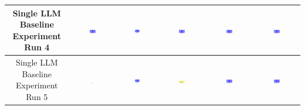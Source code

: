 \begin{table}[H]
\begin{tabular}{|c|c|c|c|c|c|}
    \hline
    Single LLM Baseline Experiment Run 4 & \includegraphics[width=0.15\textwidth]{./run_4/png/gpt-4o_results/BasicLayout.png} & \includegraphics[width=0.15\textwidth]{./run_4/png/claude-3-5-sonnet-20240620_results/BasicLayout.png} & \includegraphics[width=0.15\textwidth]{./run_4/png/watsonx_meta-llama_llama-3-1-70b-instruct_results/BasicLayout.png} & \includegraphics[width=0.15\textwidth]{./run_4/png/watsonx_meta-llama_llama-3-405b-instruct_results/BasicLayout.png} & \includegraphics[width=0.15\textwidth]{./run_4/png/o1-preview_results/BasicLayout.png} \\
    \hline
    Single LLM Baseline Experiment Run 5 & \includegraphics[width=0.15\textwidth]{./run_5/png/gpt-4o_results/BasicLayout.png} & \includegraphics[width=0.15\textwidth]{./run_5/png/claude-3-5-sonnet-20240620_results/BasicLayout.png} & \includegraphics[width=0.15\textwidth]{./run_5/png/watsonx_meta-llama_llama-3-1-70b-instruct_results/BasicLayout.png} & \includegraphics[width=0.15\textwidth]{./run_5/png/watsonx_meta-llama_llama-3-405b-instruct_results/BasicLayout.png} & \includegraphics[width=0.15\textwidth]{./run_5/png/o1-preview_results/BasicLayout.png} \\

\end{tabular}
\end{table}
